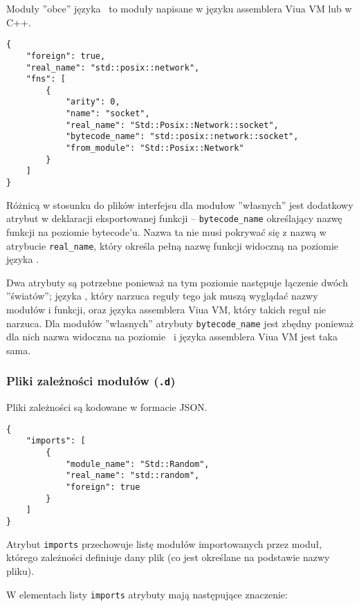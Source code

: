 Moduły ''obce'' języka \ViuAct\ to moduły napisane w języku assemblera Viua VM lub w C++.

\begin{small}
\begin{lstlisting}
{
    "foreign": true,
    "real_name": "std::posix::network",
    "fns": [
        {
            "arity": 0,
            "name": "socket",
            "real_name": "Std::Posix::Network::socket",
            "bytecode_name": "std::posix::network::socket",
            "from_module": "Std::Posix::Network"
        }
    ]
}
\end{lstlisting}
\end{small}

Różnicą w stosunku do plików interfejsu dla modułow ''własnych'' jest dodatkowy atrybut w deklaracji
eksportowanej funkcji -- \texttt{bytecode\_name} określający nazwę funkcji na poziomie bytecode'u. Nazwa ta
nie musi pokrywać się z nazwą w atrybucie \texttt{real\_name}, który określa pełną nazwę funkcji widoczną na
poziomie języka \ViuAct.

Dwa atrybuty są potrzebne ponieważ na tym poziomie następuje łączenie dwóch ''światów''; języka \ViuAct, który
narzuca reguły tego jak muszą wyglądać nazwy modułów i funkcji, oraz języka assemblera Viua VM, który takich
reguł nie narzuca. Dla modułów ''własnych'' atrybuty \texttt{bytecode\_name} jest zbędny ponieważ dla nich
nazwa widoczna na poziomie \ViuAct\ i języka assemblera Viua VM jest taka sama.

\subsubsection{Pliki zależności modułów (\texttt{.d})}
\label{pliki_zaleznosci_modulow}

Pliki zależności są kodowane w formacie JSON.

\begin{small}
\begin{lstlisting}
{
    "imports": [
        {
            "module_name": "Std::Random",
            "real_name": "std::random",
            "foreign": true
        }
    ]
}
\end{lstlisting}
\end{small}

Atrybut \texttt{imports} przechowuje listę modułów importowanych przez moduł, którego zależności definiuje
dany plik (co jest określane na podstawie nazwy pliku).

W elementach listy \texttt{imports} atrybuty mają następujące znaczenie:

